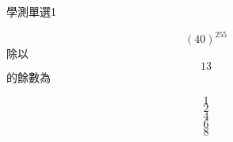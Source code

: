 \begin{QUESTIONS}
    \begin{QUESTION}
        \begin{ExamInfo}{85}{學測}{單選}{1}
        \end{ExamInfo}
        \begin{ExamAnsRateInfo}{}{}{}{}
        \end{ExamAnsRateInfo}
        \begin{QBODY}
            \[{{\left( 40 \right)}^{255}}\]除以\[13\]的餘數為
            \begin{QOPS} 
                \QOP\[1\]	
                \QOP\[2\]	
                \QOP\[4\]
                \QOP\[6\]	
                \QOP\[8\]
            \end{QOPS}
            

\end{QBODY}
\end{QUESTION}
\end{QUESTIONS}
